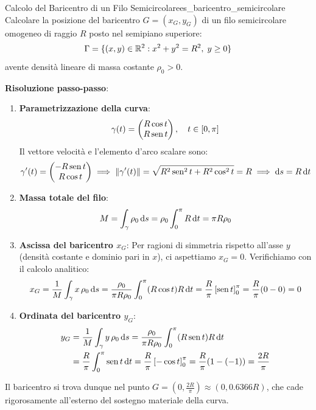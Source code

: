 \begin{esempio}{Calcolo del Baricentro di un Filo Semicircolare}{es_baricentro_semicircolare}
Calcolare la posizione del baricentro $G = (x_G, y_G)$ di un filo semicircolare omogeneo di raggio $R$ posto nel semipiano superiore:
\[
\Gamma = \{(x,y) \in \mathbb{R}^2 : x^2 + y^2 = R^2, \; y \ge 0\}
\]
avente densità lineare di massa costante $\rho_0 > 0$.

\textbf{Risoluzione passo-passo}:
\begin{enumerate}
    \item \textbf{Parametrizzazione della curva}:
    \[
    \gamma(t) = \begin{pmatrix} R\cos t \\ R\operatorname{sen} t \end{pmatrix}, \quad t \in [0, \pi]
    \]
    Il vettore velocità e l'elemento d'arco scalare sono:
    \[
    \gamma'(t) = \begin{pmatrix} -R\operatorname{sen} t \\ R\cos t \end{pmatrix} \implies \lVert\gamma'(t)\rVert = \sqrt{R^2\operatorname{sen}^2 t + R^2\cos^2 t} = R \implies \mathop{}\!\mathrm{d} s = R\mathop{}\!\mathrm{d} t
    \]
    \item \textbf{Massa totale del filo}:
    \[
    M = \int_\gamma \rho_0 \mathop{}\!\mathrm{d} s = \rho_0 \int_{0}^{\pi} R \mathop{}\!\mathrm{d} t = \pi R \rho_0
    \]
    \item \textbf{Ascissa del baricentro $x_G$}:
    Per ragioni di simmetria rispetto all'asse $y$ (densità costante e dominio pari in $x$), ci aspettiamo $x_G = 0$. Verifichiamo con il calcolo analitico:
    \[
    x_G = \frac{1}{M} \int_\gamma x \, \rho_0 \mathop{}\!\mathrm{d} s = \frac{\rho_0}{\pi R \rho_0} \int_{0}^{\pi} (R\cos t) R \mathop{}\!\mathrm{d} t = \frac{R}{\pi} \left[ \operatorname{sen} t \right]_{0}^{\pi} = \frac{R}{\pi} (0 - 0) = 0
    \]
    \item \textbf{Ordinata del baricentro $y_G$}:
    \begin{align*}
    y_G &= \frac{1}{M} \int_\gamma y \, \rho_0 \mathop{}\!\mathrm{d} s = \frac{\rho_0}{\pi R \rho_0} \int_{0}^{\pi} (R\operatorname{sen} t) R \mathop{}\!\mathrm{d} t \\
    &= \frac{R}{\pi} \int_{0}^{\pi} \operatorname{sen} t \mathop{}\!\mathrm{d} t = \frac{R}{\pi} \left[ -\cos t \right]_{0}^{\pi} = \frac{R}{\pi} (1 - (-1)) = \frac{2R}{\pi}
    \end{align*}
\end{enumerate}
Il baricentro si trova dunque nel punto $G = \left(0, \frac{2R}{\pi}\right) \approx (0, 0.6366 R)$, che cade rigorosamente all'esterno del sostegno materiale della curva.
\end{esempio}

